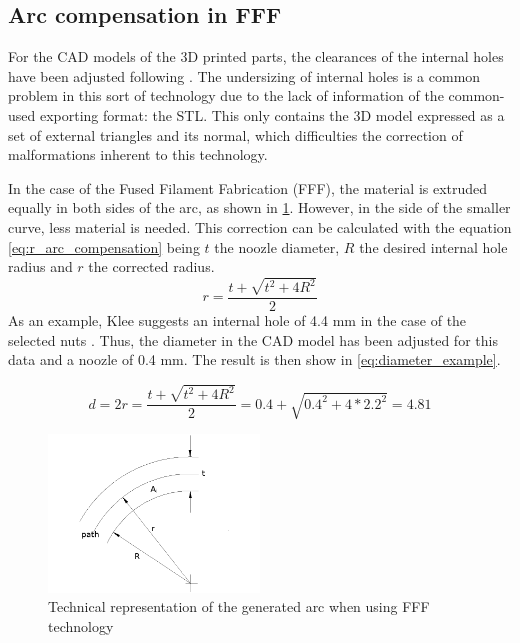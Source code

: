  \subsection{Arc compensation in FFF} %
  \label{sub:arc_compensation}
  For the CAD models of the 3D printed parts, the clearances of the internal holes have been adjusted following \cite{arc_compensation}.
  The undersizing of internal holes is a common problem in this sort of technology due to the lack of information of the common-used exporting format: the STL.
  This only contains the 3D model expressed as a set of external triangles and its normal, which difficulties the correction of malformations inherent to this technology.

  In the case of the Fused Filament Fabrication (FFF), the material is extruded equally in both sides of the arc, as shown in \ref{fig:arc_compensation}. 
  However, in the side of the smaller curve, less material is needed.
  This correction can be calculated with the equation \ref{eq:r_arc_compensation}   being $t$ the noozle diameter, $R$ the desired internal hole radius and $r$ the corrected radius.
  \begin{equation}
    \label{eq:r_arc_compensation}
    r=\frac{t+\sqrt{t^2+4R^2}}{2}
  \end{equation}
  As an example, Klee suggests an internal hole of 4.4 mm in the case of the selected nuts \cite{klee}. 
  Thus, the diameter in the CAD model has been adjusted for this data and a noozle of 0.4 mm. The result is then show in \ref{eq:diameter_example}.

  \begin{equation}
    \label{eq:diameter_example}
    d=2r=\frac{t+\sqrt{t^2+4R^2}}{2}=0.4+\sqrt{0.4^2+4*2.2^2}=4.81
  \end{equation}

  \begin{figure}[tb]
    \centering
    \includegraphics[width=0.5\textwidth]{figures/Arc-compensation}
    \caption{Technical representation of the generated arc when using FFF technology}
    \label{fig:arc_compensation}
  \end{figure}

